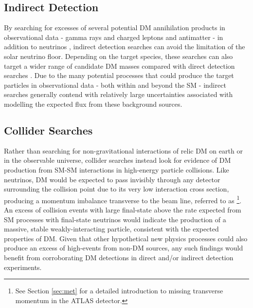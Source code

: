 \subsection{Indirect Detection}

By searching for excesses of several potential DM annihilation products in observational data - gamma rays and charged leptons and antimatter - in addition to neutrinos \cite{conrad2014indirect, pdg_2018}, indirect detection searches can avoid the limitation of the solar neutrino floor. Depending on the target species, these searches can also target a wider range of candidate DM masses compared with direct detection searches \cite{pdg_2018}. Due to the many potential processes that could produce the target particles in observational data - both within and beyond the SM - indirect searches generally contend with relatively large uncertainties associated with modelling the expected flux from these background sources. 

\subsection{Collider Searches}

Rather than searching for non-gravitational interactions of relic DM on earth or in the observable universe, collider searches \cite{DM_colliders} instead look for evidence of DM production from SM-SM interactions in high-energy particle collisions. Like neutrinos, DM would be expected to pass invisibly through any detector surrounding the collision point due to its very low interaction cross section, producing a momentum imbalance transverse to the beam line, referred to as \met\footnote{See Section \ref{sec:met} for a detailed introduction to missing transverse momentum in the ATLAS detector.}. An excess of collision events with large final-state \met above the rate expected from SM processes with final-state neutrinos would indicate the production of a massive, stable weakly-interacting particle, consistent with the expected properties of DM. Given that other hypothetical new physics processes \cite{add_1998,dark_energy_lhc} could also produce an excess of high-\met events from non-DM sources, any such findings would benefit from corroborating DM detections in direct and/or indirect detection experiments.


